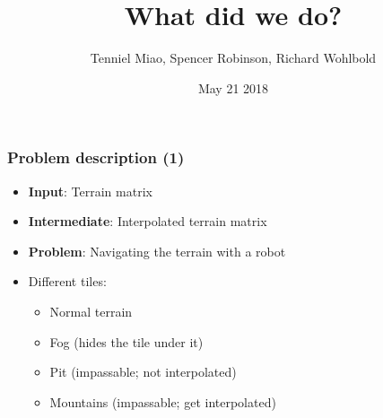 \documentclass{beamer}
\title{What did we do?}
\author{Tenniel Miao, Spencer Robinson, Richard Wohlbold}
\date{May 21 2018}
\begin{document}
\maketitle

\begin{frame}
    \frametitle{Problem description (1)}
    
    \begin{itemize}
        \item \textbf{Input}: Terrain matrix
        \item \textbf{Intermediate}: Interpolated terrain matrix
        \item \textbf{Problem}: Navigating the terrain with a robot
        \item Different tiles:
            \begin{itemize}
                \item Normal terrain
                \item Fog (hides the tile under it)
                \item Pit (impassable; not interpolated)
                \item Mountains (impassable; get interpolated)
            \end{itemize}
    \end{itemize}
    
\end{frame}
\end{document}

